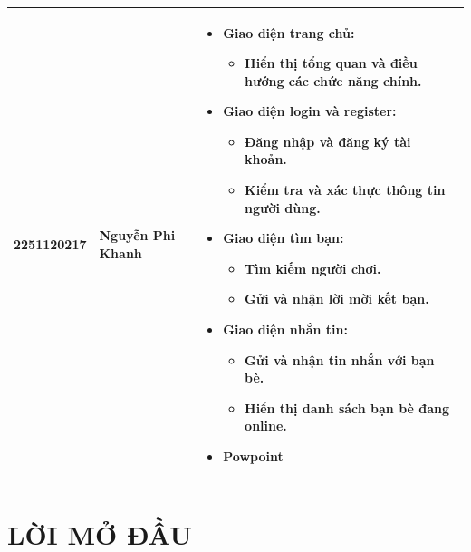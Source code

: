 \documentclass[a4paper,12pt]{article}
\begin{document}
\begin{center}
\begin{tabular}{| C{2cm} | C{3cm} | m{8cm} |}
  2251120217
  & Nguyễn Phi Khanh
  &
  \begin{itemize}[leftmargin=*,itemsep=0pt,parsep=0pt]
    \item \textbf{Giao diện trang chủ:}
      \begin{itemize}[leftmargin=1em,itemsep=0pt]
        \item Hiển thị tổng quan và điều hướng các chức năng chính.
      \end{itemize}
    \item \textbf{Giao diện login và register:}
      \begin{itemize}[leftmargin=1em,itemsep=0pt]
        \item Đăng nhập và đăng ký tài khoản.
        \item Kiểm tra và xác thực thông tin người dùng.
      \end{itemize}
    \item \textbf{Giao diện tìm bạn:}
      \begin{itemize}[leftmargin=1em,itemsep=0pt]
        \item Tìm kiếm người chơi.
        \item Gửi và nhận lời mời kết bạn.
      \end{itemize}
    \item \textbf{Giao diện nhắn tin:}
      \begin{itemize}[leftmargin=1em,itemsep=0pt]
        \item Gửi và nhận tin nhắn với bạn bè.
        \item Hiển thị danh sách bạn bè đang online.
      \end{itemize}
    \item \textbf{Powpoint}
  \end{itemize}
  \\
  \hline
\end{tabular}
\end{center}

\restoregeometry

\newpage
\thispagestyle{empty}
\tableofcontents



\newpage %


\section*{\centering LỜI MỞ ĐẦU} %
\end{document}
